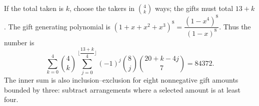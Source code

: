 If the total taken is $k$, choose the takers in $\binom4k$ ways; the gifts must total $13+k$. The gift generating polynomial is $(1+x+x^2+x^3)^8=\dfrac{(1-x^4)^8}{(1-x)^8}$. Thus the number is\[\sum_{k=0}^4\binom4k\sum_{j=0}^{\lfloor\dfrac{13+k}{4}\rfloor}(-1)^j\binom8j\binom{20+k-4j}{7}=\boxed{84372}.\]The inner sum is also inclusion--exclusion for eight nonnegative gift amounts bounded by three: subtract arrangements where a selected amount is at least four.

